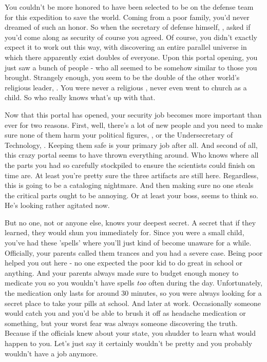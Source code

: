 \documentclass[char]{guildcamp3}
\begin{document}
\name{\cSpecOpTwo{}}



You couldn't be more honored to have been selected to be on the defense team for this expedition to save the world. Coming from a poor family, you'd never dreamed of such an honor. So when the secretary of defense himself, \cPoliOne{\intro}, asked if you'd come along as security of course you agreed. Of course, you didn't exactly expect it to work out this way, with discovering an entire parallel universe in which there apparently exist doubles of everyone. Upon this portal opening, you just saw a bunch of people - who all seemed to be somehow similar to those you brought. Strangely enough, you seem to be the double of the other world's religious leader, \cPaladin{\intro}. You were never a religious \cSpecOpTwo{\human}, never even went to church as a child. So who really knows what's up with that.

Now that this portal has opened, your security job becomes more important than ever for two reasons. First, well, there's a lot of new people and you need to make sure none of them harm your political figures, \cPoliOne{}, or the Undersecretary of Technology, \cPoliTwo{}. Keeping them safe is your primary job after all. And second of all, this crazy portal seems to have thrown everything around. Who knows where all the parts you had so carefully stockpiled to ensure the scientists could finish on time are. At least you're pretty sure the three artifacts are still here. Regardless, this is going to be a cataloging nightmare. And then making sure no one steals the critical parts ought to be annoying. Or at least your boss, \cSpecOpOne{\intro} seems to think so. He's looking rather agitated now. 

But no one, not \cPoliOne{} or anyone else, knows your deepest secret. A secret that if they learned, they would shun you immediately for. Since you were a small child, you've had these 'spells' where you'll just kind of become unaware for a while. Officially, your parents called them trances and you had a severe case. Being poor helped you out here - no one expected the poor kid to do great in school or anything. And your parents always made sure to budget enough money to medicate you so you wouldn't have spells \emph{too} often during the day. Unfortunately, the medication only lasts for around 30 minutes, so you were always looking for a secret place to take your pills at school. And later at work. Occasionally someone would catch you and you'd be able to brush it off as headache medication or something, but your worst fear was always someone discovering the truth. Because if the officials knew about your state, you shudder to learn what would happen to you. Let's just say it certainly wouldn't be pretty and you probably wouldn't have a job anymore.
\end{document}
